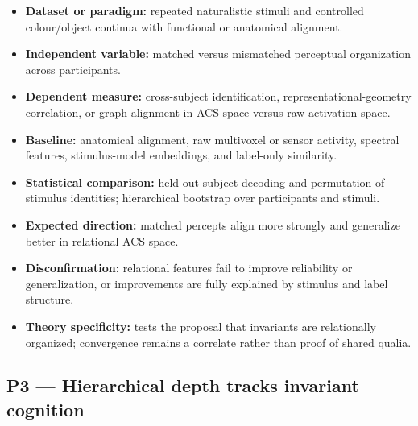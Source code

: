 \documentclass[
  11pt,
  a4paper,
]{article}
\providecommand{\tightlist}{%
  \setlength{\itemsep}{0pt}\setlength{\parskip}{0pt}}
\begin{document}
\begin{itemize}
\tightlist
\item
  \textbf{Dataset or paradigm:} repeated naturalistic stimuli and
  controlled colour/object continua with functional or anatomical
  alignment.
\item
  \textbf{Independent variable:} matched versus mismatched perceptual
  organization across participants.
\item
  \textbf{Dependent measure:} cross-subject identification,
  representational-geometry correlation, or graph alignment in ACS space
  versus raw activation space.
\item
  \textbf{Baseline:} anatomical alignment, raw multivoxel or sensor
  activity, spectral features, stimulus-model embeddings, and label-only
  similarity.
\item
  \textbf{Statistical comparison:} held-out-subject decoding and
  permutation of stimulus identities; hierarchical bootstrap over
  participants and stimuli.
\item
  \textbf{Expected direction:} matched percepts align more strongly and
  generalize better in relational ACS space.
\item
  \textbf{Disconfirmation:} relational features fail to improve
  reliability or generalization, or improvements are fully explained by
  stimulus and label structure.
\item
  \textbf{Theory specificity:} tests the proposal that invariants are
  relationally organized; convergence remains a correlate rather than
  proof of shared qualia.
\end{itemize}

\subsection{P3 --- Hierarchical depth tracks invariant
cognition}\label{p3-hierarchical-depth-tracks-invariant-cognition}
\end{document}
